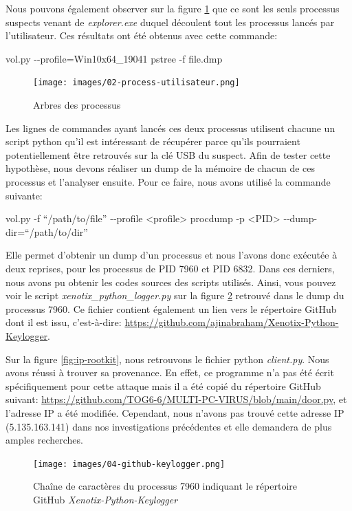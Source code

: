 \documentclass[a4paper]{article}
\begin{document}
Nous pouvons également observer sur la figure \ref{fig:process-utilisateur} que ce sont les seuls processus suspects venant de \textit{explorer.exe} duquel découlent tout les processus lancés par l'utilisateur. Ces résultats ont été obtenus avec cette commande:
\begin{example}
    vol.py -{}-profile=Win10x64\_19041 pstree -f file.dmp
\end{example}

\begin{figure}[H]
    \centering
    \texttt{[image: images/02-process-utilisateur.png]}
    \caption{Arbres des processus}
    \label{fig:process-utilisateur}
\end{figure}

Les lignes de commandes ayant lancés ces deux processus utilisent chacune un script python qu'il est intéressant de récupérer parce qu'ils pourraient potentiellement être retrouvés sur la clé USB du suspect. Afin de tester cette hypothèse, nous devons réaliser un dump de la mémoire de chacun de ces processus et l'analyser ensuite. Pour ce faire, nous avons utilisé la commande suivante:
\begin{example}
    vol.py -f “/path/to/file” ‑{}‑profile <profile> procdump -p <PID> ‑{}‑dump-dir=“/path/to/dir”
\end{example}

Elle permet d'obtenir un dump d'un processus et nous l'avons donc exécutée à deux reprises, pour les processus de PID 7960 et PID 6832. Dans ces derniers, nous avons pu obtenir les codes sources des scripts utilisés. Ainsi, vous pouvez voir le script \textit{xenotix\_python\_logger.py} sur la figure \ref{fig:github-keylogger} retrouvé dans le dump du processus 7960. Ce fichier contient également un lien vers le répertoire GitHub dont il est issu, c'est-à-dire: {\small \url{https://github.com/ajinabraham/Xenotix-Python-Keylogger}}.

Sur la figure \ref{fig:ip-rootkit}, nous retrouvons le fichier python \textit{client.py}. Nous avons réussi à trouver sa provenance. En effet, ce programme n'a pas été écrit spécifiquement pour cette attaque mais il a été copié du répertoire GitHub suivant: {\small \url{https://github.com/TOG6-6/MULTI-PC-VIRUS/blob/main/door.py}}, et l'adresse IP a été modifiée. Cependant, nous n'avons pas trouvé cette adresse IP (5.135.163.141) dans nos investigations précédentes et elle demandera de plus amples recherches.

\begin{figure}[H]
    \centering
    \texttt{[image: images/04-github-keylogger.png]}
    \caption{Chaîne de caractères du processus 7960 indiquant le répertoire GitHub \textit{Xenotix-Python-Keylogger}}
    \label{fig:github-keylogger}
\end{figure}
\end{document}

